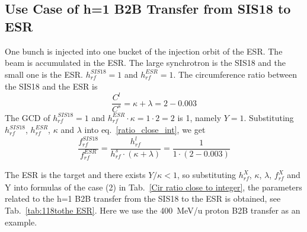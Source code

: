 \subsection{Use Case of h=1 B2B Transfer from SIS18 to ESR} 
One bunch is injected into one bucket of the injection orbit of the ESR. The beam is accumulated in the ESR. The large synchrotron is the SIS18 and the small one is the ESR. $h^{\mathit{SIS18}}_\mathit{rf}=1$ and $h^{\mathit{ESR}}_\mathit{rf}=1$. The circumference ratio between the SIS18 and the ESR is
\begin{equation}
\frac{C^l}{C^s}=\kappa + \lambda =2-0.003
\end{equation}
The GCD of $h^{\mathit{SIS18}}_\mathit{rf}=1$ and $h^{\mathit{ESR}}_\mathit{rf}\cdot \kappa=1\cdot 2=2$ is 1, namely $Y=1$. Substituting $h^{\mathit{SIS18}}_\mathit{rf}$, $h^{\mathit{ESR}}_\mathit{rf}$, $\kappa$ and $\lambda$ into eq.~\ref{ratio_close_int}, we get
\begin{equation}
\frac {f_{\mathit{rf}}^{\mathit{SIS18}}}{f_{\mathit{rf}}^{\mathit{ESR}}}= \frac{h^l_\mathit{rf}}{h^s_\mathit{rf} \cdot (\kappa+ \lambda)}=\frac {1}{1 \cdot(2-0.003)}
\end{equation}

The ESR is the target and there exists $Y/\kappa<1$, so substituting $h^X_\mathit{rf}$, $\kappa$, $\lambda$, $f_{\mathit{rf}}^{X}$ and Y into formulas of the case (2) in Tab.~\ref{Cir ratio close to integer}, the parameters related to the h=1 B2B transfer from the SIS18 to the ESR is obtained, see Tab.~\ref{tab:118tothe ESR}. Here we use the \SI{400}{MeV/\atomicmassunit} proton B2B transfer as an example. 

